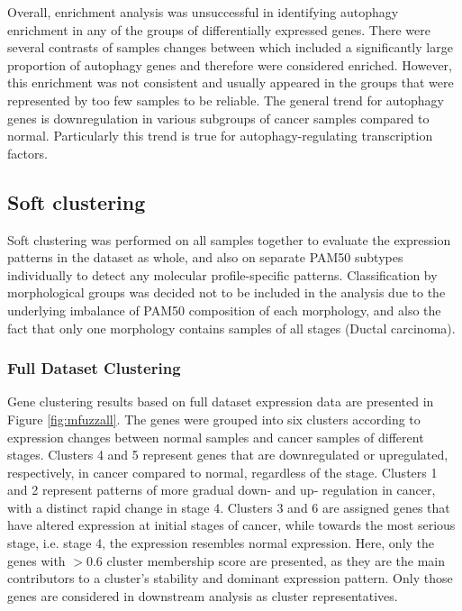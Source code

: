         Overall, enrichment analysis was unsuccessful in identifying autophagy enrichment in any of the groups of differentially expressed genes. There were several contrasts of samples changes between which included a significantly large proportion of autophagy genes and therefore were considered enriched. However, this enrichment was not consistent and usually appeared in the groups that were represented by too few samples to be reliable. The general trend for autophagy genes is downregulation in various subgroups of cancer samples compared to normal. Particularly this trend is true for autophagy-regulating transcription factors. 
        
        
        
        
        
        
        

\newpage
    \subsection{Soft clustering}
    Soft clustering was performed on all samples together to evaluate the expression patterns in the dataset as whole, and also on separate PAM50 subtypes individually to detect any molecular profile-specific patterns. Classification by morphological groups was decided not to be included in the analysis due to the underlying imbalance of PAM50 composition of each morphology, and also the fact that only one morphology contains samples of all stages (Ductal carcinoma). 

    
   
    \subsubsection{Full Dataset Clustering}
     Gene clustering results based on full dataset expression data are presented in Figure \ref{fig:mfuzzall}. The genes were grouped into six clusters according to expression changes between normal samples and cancer samples of different stages. 
     Clusters 4 and 5 represent genes that are downregulated or upregulated, respectively, in cancer compared to normal, regardless of the stage. Clusters 1 and 2 represent patterns of more gradual down- and up- regulation in cancer, with a distinct rapid change in stage 4. Clusters 3 and 6 are assigned genes that have altered expression at initial stages of cancer, while towards the most serious stage, i.e. stage 4, the expression resembles normal expression. 
     Here, only the genes with $>0.6$ cluster membership score are presented, as they are the main contributors to a cluster's stability and dominant expression pattern. Only those genes are considered in downstream analysis as cluster representatives. 


